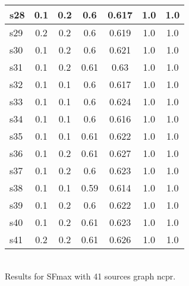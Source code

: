 \documentclass{article}
\begin{document}
\begin{tabular}{|l|c|c|c|c|c|c|}
\hline
s28 &0.1 & 0.2 & 0.6 & 0.617 & 1.0 & 1.0\\
\hline
s29 &0.2 & 0.2 & 0.6 & 0.619 & 1.0 & 1.0\\
\hline
s30 &0.1 & 0.2 & 0.6 & 0.621 & 1.0 & 1.0\\
\hline
s31 &0.1 & 0.2 & 0.61 & 0.63 & 1.0 & 1.0\\
\hline
s32 &0.1 & 0.1 & 0.6 & 0.617 & 1.0 & 1.0\\
\hline
s33 &0.1 & 0.1 & 0.6 & 0.624 & 1.0 & 1.0\\
\hline
s34 &0.1 & 0.1 & 0.6 & 0.616 & 1.0 & 1.0\\
\hline
s35 &0.1 & 0.1 & 0.61 & 0.622 & 1.0 & 1.0\\
\hline
s36 &0.1 & 0.2 & 0.61 & 0.627 & 1.0 & 1.0\\
\hline
s37 &0.1 & 0.2 & 0.6 & 0.623 & 1.0 & 1.0\\
\hline
s38 &0.1 & 0.1 & 0.59 & 0.614 & 1.0 & 1.0\\
\hline
s39 &0.1 & 0.2 & 0.6 & 0.622 & 1.0 & 1.0\\
\hline
s40 &0.1 & 0.2 & 0.61 & 0.623 & 1.0 & 1.0\\
\hline
s41 &0.2 & 0.2 & 0.61 & 0.626 & 1.0 & 1.0\\
\hline
\end{tabular}\\

\noindent Results for SFmax with 41 sources graph ncpr.
\end{document}
